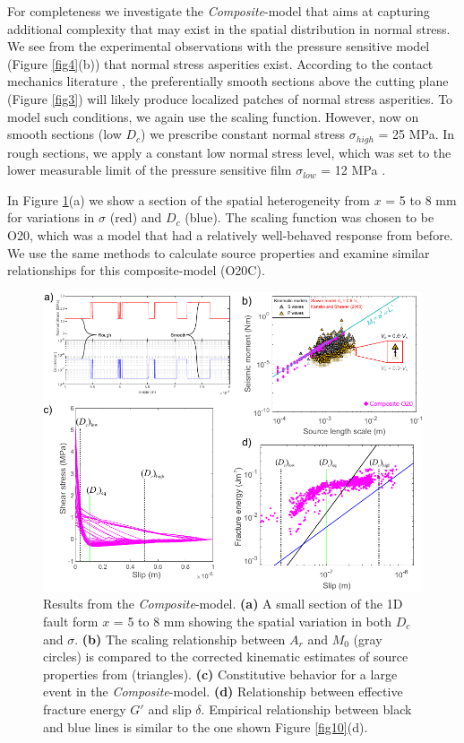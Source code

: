 \documentclass[draft]{agujournal2019}
\begin{document}
For completeness we investigate the \textit{Composite}-model that aims at capturing additional complexity that may exist in the spatial distribution in normal stress. We see from the experimental observations with the pressure sensitive model (Figure \ref{fig4}(b)) that normal stress asperities exist. According to the contact mechanics literature \cite{Nayak1971, Nayak1973}, the preferentially smooth sections above the cutting plane (Figure \ref{fig3}) will likely produce localized patches of normal stress asperities. To model such conditions, we again use the scaling function. However, now on smooth sections (low $D_{c}$) we prescribe constant normal stress $\sigma_{high}$ = 25 MPa.  In rough sections, we apply a constant low normal stress level, which was set to the lower measurable limit of the pressure sensitive film $\sigma_{low}$ = 12 MPa \cite{Selvadurai2015a}. 

In Figure \ref{fig12}(a) we show a section of the spatial heterogeneity from $x$ =  5 to 8 mm for variations in $\sigma$ (red) and $D_{c}$ (blue).  The scaling function was chosen to be O20, which was a model that had a relatively well-behaved response from before.  We use the same methods to calculate source properties and examine similar relationships for this composite-model (O20C).

\begin{figure}
	\centering
	\includegraphics{FIG12.pdf} 
	\caption{Results from the \textit{Composite}-model. \textbf{(a)} A small section of the 1D fault form $x$ = 5 to 8 mm showing the spatial variation in both $D_{c}$ and $\sigma$. \textbf{(b)} The scaling relationship between $A_{r}$ and $M_{0}$ (gray circles) is compared to the corrected kinematic estimates of source properties from  (triangles).   \textbf{(c)} Constitutive behavior for a large event in the \textit{Composite}-model. \textbf{(d)} Relationship between effective fracture energy $G'$ and slip $\delta$. Empirical relationship between black and blue lines is similar to the one shown Figure \ref{fig10}(d).}
	\label{fig12}
\end{figure}
\end{document}
